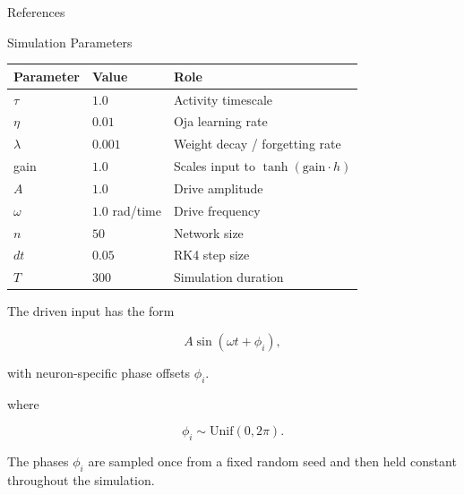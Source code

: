 \documentclass[
11pt,notheorems,hyperref={pdfauthor=whatever}
]{beamer}
\begin{document}
\begin{frame}{References}
\nocite{*}


\end{frame}

\begin{frame}{Simulation Parameters}
\small

\begin{center}
\begin{tabular}{lll}
\hline
\textbf{Parameter} & \textbf{Value} & \textbf{Role} \\
\hline
\(\tau\) & \(1.0\) & Activity timescale \\
\(\eta\) & \(0.01\) & Oja learning rate \\
\(\lambda\) & \(0.001\) & Weight decay / forgetting rate \\
gain & \(1.0\) & Scales input to \(\tanh(\text{gain}\cdot h)\) \\
\(A\) & \(1.0\) & Drive amplitude \\
\(\omega\) & \(1.0\) rad/time & Drive frequency \\
\(n\) & \(50\) & Network size \\
\(dt\) & \(0.05\) & RK4 step size \\
\(T\) & \(300\) & Simulation duration \\
\hline
\end{tabular}
\end{center}

\vspace{0.7em}

The driven input has the form

\[
A\sin(\omega t+\phi_i),
\]

with neuron-specific phase offsets \(\phi_i\).

where

\[
\phi_i\sim \mathrm{Unif}(0,2\pi).
\]

The phases \(\phi_i\) are sampled once from a fixed random seed and then held
constant throughout the simulation.

\end{frame}
\end{document}
